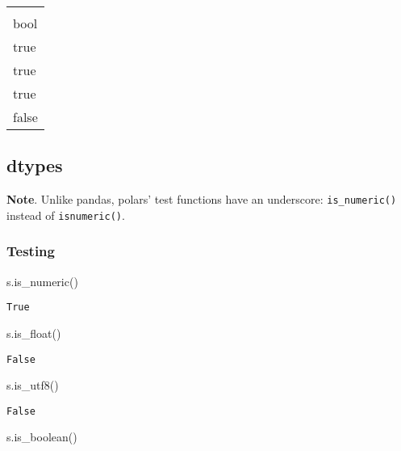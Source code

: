 \documentclass[
  letterpaper,
  DIV=11,
  numbers=noendperiod]{scrartcl}
\newenvironment{Shaded}{\begin{snugshade}}{\end{snugshade}}
\newcommand{\NormalTok}[1]{\textcolor[rgb]{0.00,0.23,0.31}{#1}}
\begin{document}
\begin{longtable}[]{@{}l@{}}
\toprule()
 \\
bool \\
\midrule()
\endhead
true \\
true \\
true \\
false \\
\bottomrule()
\end{longtable}

\hypertarget{dtypes}{%
\subsection{dtypes}\label{dtypes}}

\textbf{Note}. Unlike pandas, polars' test functions have an underscore:
\texttt{is\_numeric()} instead of \texttt{isnumeric()}.

\hypertarget{testing}{%
\subsubsection{Testing}\label{testing}}

\begin{Shaded}
\begin{Highlighting}[]
\NormalTok{s.is\_numeric()}
\end{Highlighting}
\end{Shaded}

\begin{verbatim}
True
\end{verbatim}

\begin{Shaded}
\begin{Highlighting}[]
\NormalTok{s.is\_float()}
\end{Highlighting}
\end{Shaded}

\begin{verbatim}
False
\end{verbatim}

\begin{Shaded}
\begin{Highlighting}[]
\NormalTok{s.is\_utf8()}
\end{Highlighting}
\end{Shaded}

\begin{verbatim}
False
\end{verbatim}

\begin{Shaded}
\begin{Highlighting}[]
\NormalTok{s.is\_boolean()}
\end{Highlighting}
\end{Shaded}
\end{document}
